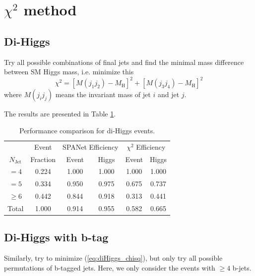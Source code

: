 \documentclass[12pt]{article}
\begin{document}


\section{\texorpdfstring{$\chi^2$}{Chi square} method}%
\label{sec:chi_2_method}
	\subsection{Di-Higgs}%
	\label{sub:di_higgs}
		Try all possible combinations of final jets and find the minimal mass difference between SM Higgs mass, i.e. minimize this
		\begin{equation}\label{eq:diHiggs_chisq}
			\chi^2 = [M(j_1j_2)-M_\text{H}]^2 + [M(j_3j_4)-M_\text{H}]^2
		\end{equation}
		where $M(j_ij_j)$ means the invariant mass of jet $i$ and jet $j$.

		The results are presented in Table \ref{tab:comparison_SPANet_and_chi2}.

		\begin{table}[htpb]
			\centering
			\caption{Performance comparison for di-Higgs events.}
			\label{tab:comparison_SPANet_and_chi2}
			\begin{tabular}{c|c|cc|cc}
					  & Event    & \multicolumn{2}{|c|}{SPANet Efficiency} & \multicolumn{2}{|c}{ $\chi^2$ Efficiency} \\
				$N_\text{Jet}$ & Fraction & Event             & Higgs             & Event            & Higgs           \\
				\hline
				$=4$	  &   0.224       &     1.000       &   1.000       &   1.000           &    1.000             \\
				$=5$	  &   0.334       &     0.950       &   0.975       &   0.675           &    0.737            \\
				$\ge 6$	  &   0.442       &     0.844       &   0.918		&   0.313           &    0.441            \\
				Total	  &   1.000       &     0.914       &   0.955       &   0.582           &    0.665            
			\end{tabular}
		\end{table}

	\subsection{Di-Higgs with b-tag}%
	\label{sub:di_higgs_with_b_tag}
		Similarly, try to minimize (\ref{eq:diHiggs_chisq}), but only try all possible permutations of b-tagged jets. Here, we only consider the events with $\ge 4$ b-jets.
\end{document}
